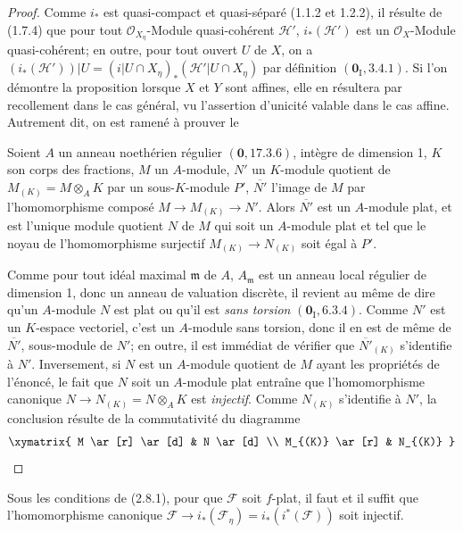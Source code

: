 \begin{proof}
Comme $i_*$ est quasi-compact et quasi-séparé (1.1.2 et 1.2.2), il résulte de
(1.7.4) que pour tout $\mathcal O_{X_\eta}$-Module quasi-cohérent
$\mathcal H'$, $i_*(\mathcal H')$ est un $\mathcal O_X$-Module
quasi-cohérent; en outre, pour tout ouvert $U$ de $X$, on a
$(i_*(\mathcal H'))|U=(i|U\cap X_\eta)_*(\mathcal H'|U\cap X_\eta)$
par définition $(\mathbf{0}_{\mathrm I},3.4.1)$. Si l'on démontre la proposition
lorsque $X$ et $Y$ sont affines, elle en résultera par recollement dans le cas
général, vu l'assertion d'unicité valable dans le cas affine. Autrement dit,
on est ramené à prouver le

\begin{lemma}[2.8.1.1]
\label{IV.2.8.1.1-fr}
Soient $A$ un anneau noethérien régulier $(\mathbf{0},17.3.6)$, intègre de dimension
1, $K$ son corps des fractions, $M$ un $A$-module, $N'$ un $K$-module
quotient de $M_{(K)}=M\otimes_A K$ par un sous-$K$-module $P'$,
$\overline{N'}$ l'image de $M$ par l'homomorphisme composé
$M\to M_{(K)}\to N'$. Alors $\overline{N'}$ est un $A$-module plat, et est
l'unique module quotient $N$ de $M$ qui soit un $A$-module plat et tel que le
noyau de l'homomorphisme surjectif $M_{(K)}\to N_{(K)}$ soit égal à $P'$.
\end{lemma}

Comme pour tout idéal maximal $\mathfrak m$ de $A$, $A_{\mathfrak m}$ est un
anneau local régulier de dimension 1, donc un anneau de valuation discrète,
il revient au même de dire qu'un $A$-module $N$ est plat ou qu'il est
\emph{sans torsion} $(\mathbf{0}_{\mathrm I},6.3.4)$. Comme $N'$ est un $K$-espace
vectoriel, c'est un $A$-module sans torsion, donc il en est de même de
$\overline{N'}$, sous-module de $N'$; en outre, il est immédiat de vérifier
que $\overline{N'}_{(K)}$ s'identifie à $N'$. Inversement, si $N$ est un
$A$-module quotient de $M$ ayant les propriétés de l'énoncé, le fait que $N$
soit un $A$-module plat entraîne que l'homomorphisme canonique
$N\to N_{(K)}=N\otimes_A K$ est \emph{injectif}. Comme $N_{(K)}$ s'identifie à
$N'$, la conclusion résulte de la commutativité du diagramme
\[
\xymatrix{
M \ar[r] \ar[d] & N \ar[d] \\
M_{(K)} \ar[r] & N_{(K)}
}
\]
\end{proof}

\begin{corollary}[2.8.2]
\label{IV.2.8.2-fr}
Sous les conditions de \textup{(2.8.1)}, pour que $\mathcal F$ soit $f$-plat, il faut
et il suffit que l'homomorphisme canonique
$\mathcal F\to i_*(\mathcal F_\eta)=i_*(i^*(\mathcal F))$
soit injectif.
\end{corollary}

